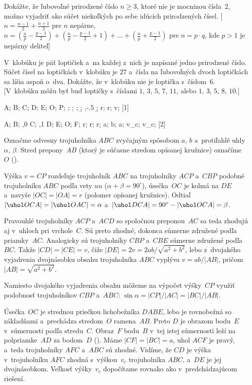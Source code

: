 {\D
Dokážte, že ľubovoľné prirodzené číslo $n\ge 3$, ktoré nie je mocninou čísla~$2$, možno vyjadriť ako súčet niekoľkých po sebe idúcich prirodzených čísel. [$n=\frac{n-1}2+\frac{n+1}2$ pre $n$ nepárne, $n=(\frac np-\frac{p-1}2)+(\frac
 np-\frac{p-1}2+1)+\dots+(\frac np+\frac{p-1}2)$ pre $n=p\cdot q$, kde $p>1$ je nepárny deliteľ]

V~klobúku je päť loptičiek a~na každej z~nich je napísané jedno prirodzené číslo. Súčet čísel na loptičkách v~klobúku je $27$ a~čísla na ľubovoľných dvoch loptičkách sa líšia aspoň o~dva. Dokážte, že v~klobúku nie je loptička s~číslom~$6$. [V~klobúku môžu byť buď loptičky s~číslami $1$, $3$, $5$, $7$, $11$, alebo $1$, $3$, $5$, $8$, $10$.]
}

{%
\fontplace
\tpoint A; \tpoint B; \bpoint C;
\bpoint D; \bpoint E; \tpoint O; \tpoint P;
\cpoint\a; \cpoint\a; \cpoint\a; \cpoint\b; \cpoint{},-.5 \b;
\bpoint r; \rBpoint r; \lpoint v;
[1] \hfil\Obr

\fontplace
\tpoint A; \tpoint B; \bpoint{},0 C;
\bpoint{},1 D; \bpoint E; \tpoint O;
\rpoint F;
\bpoint r; \bpoint r; \rBpoint r;
\lBpoint a; \rBpoint b; \lBpoint a;
\bpoint v_c; \bpoint v_c;
[2] \hfil\Obr

Označme odvesny trojuholníka $ABC$ zvyčajným spôsobom $a$, $b$ a~protiľahlé uhly $\alpha$, $\beta$. Stred prepony~$AB$ (ktorý je súčasne stredom opísanej kružnice) označíme~$O$ (\obr).

Výška $v=CP$ rozdeľuje trojuholník $ABC$ na trojuholníky $ACP$ a~$CBP$ podobné trojuholníku $ABC$ podľa vety $uu$
($\alpha+\beta=90^\circ$), úsečka~$OC$ je kolmá na $DE$ a~navyše $|OC|=|OA|=r$ (polomer opísanej kružnice). Odtiaľ $|\uhol OCA|=|\uhol OAC|=\alpha$ a~$|\uhol DCA|=90^\circ-|\uhol OCA|=\beta$.

Pravouhlé trojuholníky $ACP$ a~$ACD$ so spoločnou preponou~$AC$ sa teda zhodujú aj v~uhloch pri vrchole~$C$. Sú preto zhodné, dokonca súmerne združené podľa priamky~$AC$. Analogicky sú trojuholníky $CBP$ a~$CBE$ súmerne združené podľa~$BC$. Takže $|CD|=|CE|=v$, čiže
$|DE|=2v=2ab/\sqrt{a^2+b^2}$, lebo z~dvojakého vyjadrenia dvojnásobku obsahu trojuholníka $ABC$ vyplýva $v=ab/|AB|$, pričom $|AB|=\sqrt{a^2+b^2}$.

\poznamka
Namiesto dvojakého vyjadrenia obsahu môžeme na výpočet výšky~$CP$ využiť podobnosť trojuholníkov $CBP$ a~$ABC$: $\sin\alpha=|CP|/|AC|=|BC|/|AB|$.

\twocpictures

\ineriesenie
Úsečka~$OC$ je strednou priečkou lichobežníka $DABE$, lebo je rovnobežná so základňami a~prechádza stredom~$O$ ramena~$AB$. Preto $D$ je obrazom bodu~$E$ v~súmernosti podľa stredu~$C$. Obraz~$F$ bodu~$B$ v~tej istej súmernosti leží na polpriamke~$AD$ za bodom~$D$ (\obr). Máme $|CF|=|BC|=a$, uhol $ACF$ je pravý, a~teda trojuholníky $AFC$ a~$ABC$ sú zhodné. Vidíme, že $CD$ je výška v~trojuholníku $AFC$ zhodná s~výškou~$v_c$ trojuholníka $ABC$, a~$DE$ je jej dvojnásobkom. Veľkosť výšky~$v_c$ dopočítame rovnako ako v~predchádzajúcom riešení.

}
